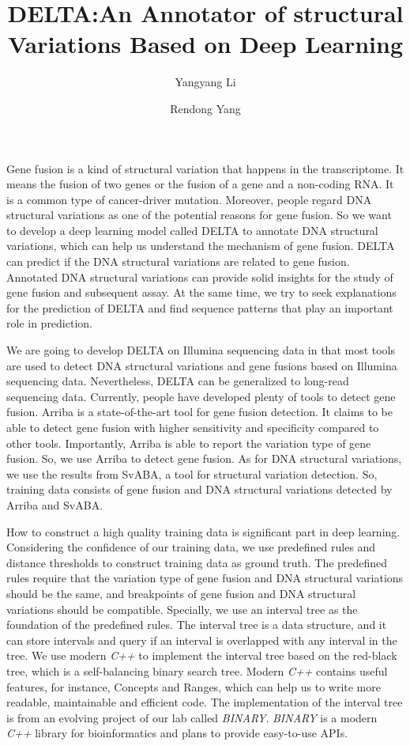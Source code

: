 \documentclass{article}
\title{DELTA:An Annotator of structural Variations Based on Deep Learning}
\author[1]{Yangyang Li}
\author[1]{Rendong Yang}
\affil[1]{Department of Urology, Northwestern University Feinberg School of Medicine, Chicago, IL 60611,
USA.}
\begin{document}
\maketitle



Gene fusion is a kind of structural variation that happens in the transcriptome.
It means the fusion of two genes or the fusion of a gene and a non-coding RNA\@.
It is a common type of cancer-driver mutation.
Moreover, people regard DNA structural variations as one of the potential reasons for gene fusion.
So we want to develop a deep learning model called DELTA to annotate DNA structural variations, which can help us understand the mechanism of gene fusion.
DELTA can predict if the DNA structural variations are related to gene fusion.
Annotated DNA structural variations can provide solid insights for the study of gene fusion and subsequent assay.
At the same time, we try to seek explanations for the prediction of DELTA and find sequence patterns that play an important role in prediction.

We are going to develop DELTA on Illumina sequencing data in that most tools are used to detect DNA structural variations and gene fusions based on Illumina sequencing data.
Nevertheless, DELTA can be generalized to long-read sequencing data.
Currently, people have developed plenty of tools to detect gene fusion.
Arriba is a state-of-the-art tool for gene fusion detection.
It claims to be able to detect gene fusion with higher sensitivity and specificity compared to other tools.
Importantly, Arriba is able to report the variation type of gene fusion.
So, we use Arriba to detect gene fusion.
As for DNA structural variations, we use the results from SvABA, a tool for structural variation detection.
So, training data consists of gene fusion and DNA structural variations detected by Arriba and SvABA\@.

How to construct a high quality training data is significant part in deep learning.
Considering the confidence of our training data, we use predefined rules and distance thresholds to construct training data as ground truth.
The predefined rules require that the variation type of gene fusion and DNA structural variations should be the same, and breakpoints of gene fusion and DNA structural variations should be compatible.
Specially, we use an interval tree as the foundation of the predefined rules.
The interval tree is a data structure, and it can store intervals and query if an interval is overlapped with any interval in the tree.
We use modern \textit{C++} to implement the interval tree based on the red-black tree, which is a self-balancing binary search tree.
Modern \textit{C++} contains useful features, for instance, Concepts and Ranges, which can help us to write more readable, maintainable and efficient code.
The implementation of the interval tree is from an evolving project of our lab called \textit{BINARY}.
\textit{BINARY} is a modern \textit{C++} library for bioinformatics and plans to provide easy-to-use APIs\@.
\end{document}
